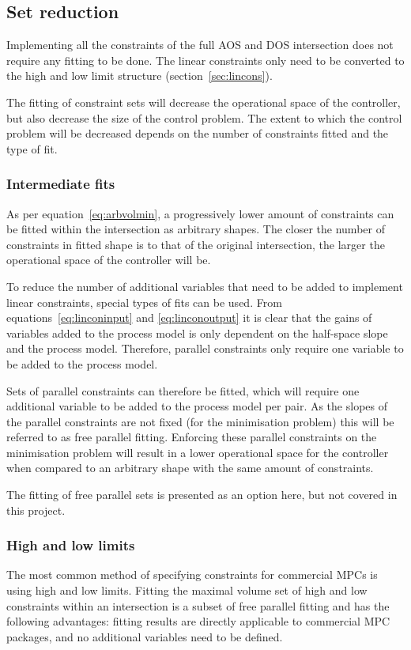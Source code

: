 \subsection{Set reduction}
Implementing all the constraints of the full AOS and DOS intersection does not require any fitting to be done.
The linear constraints only need to be converted to the high and low limit structure (section~\ref{sec:lincons}).

The fitting of constraint sets will decrease the operational space of the controller, but also decrease the size of the control problem.
The extent to which the control problem will be decreased depends on the number of constraints fitted and the type of fit.

\subsubsection{Intermediate fits}
As per equation~\ref{eq:arbvolmin}, a progressively lower amount of constraints can be fitted within the intersection as arbitrary shapes.
The closer the number of constraints in fitted shape is to that of the original intersection, the larger the operational space of the controller will be.

To reduce the number of additional variables that need to be added to implement linear constraints, special types of fits can be used.
From equations~\ref{eq:linconinput} and \ref{eq:linconoutput} it is clear that the gains of variables added to the process model is only dependent on the half-space slope and the process model.
Therefore, parallel constraints only require one variable to be added to the process model.

Sets of parallel constraints can therefore be fitted, which will require one additional variable to be added to the process model per pair.
As the slopes of the parallel constraints are not fixed (for the minimisation problem) this will be referred to as free parallel fitting.
Enforcing these parallel constraints on the minimisation problem will result in a lower operational space for the controller when compared to an arbitrary shape with the same amount of constraints.

The fitting of free parallel sets is presented as an option here, but not covered in this project.

\subsubsection{High and low limits}
The most common method of specifying constraints for commercial MPCs is using high and low limits.
Fitting the maximal volume set of high and low constraints within an intersection is a subset of free parallel fitting and has the following advantages: fitting results are directly applicable to commercial MPC packages, and no additional variables need to be defined.

